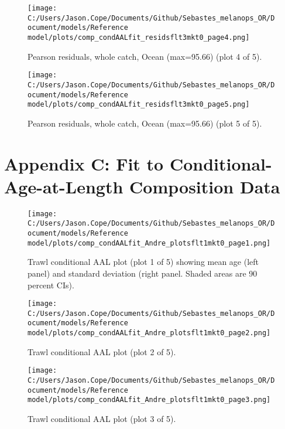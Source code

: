 \documentclass[11pt,
  english,
  letterpaper,
]{article}
\begin{document}
\begin{figure}
\centering
\texttt{[image: C:/Users/Jason.Cope/Documents/Github/Sebastes\_melanops\_OR/Document/models/Reference model/plots/comp\_condAALfit\_residsflt3mkt0\_page4.png]}
\caption{Pearson residuals, whole catch, Ocean (max=95.66) (plot 4 of 5).\label{fig:comp_condAALfit_residsflt3mkt0_page4}}
\end{figure}

\begin{figure}
\centering
\texttt{[image: C:/Users/Jason.Cope/Documents/Github/Sebastes\_melanops\_OR/Document/models/Reference model/plots/comp\_condAALfit\_residsflt3mkt0\_page5.png]}
\caption{Pearson residuals, whole catch, Ocean (max=95.66) (plot 5 of 5).\label{fig:comp_condAALfit_residsflt3mkt0_page5}}
\end{figure}

\clearpage

\hypertarget{app-c}{%
\section{Appendix C: Fit to Conditional-Age-at-Length Composition Data}\label{app-c}}

\begin{figure}
\centering
\texttt{[image: C:/Users/Jason.Cope/Documents/Github/Sebastes\_melanops\_OR/Document/models/Reference model/plots/comp\_condAALfit\_Andre\_plotsflt1mkt0\_page1.png]}
\caption{Trawl conditional AAL plot (plot 1 of 5) showing mean age (left panel) and standard deviation (right panel. Shaded areas are 90 percent CIs).\label{fig:comp_condAALfit_Andre_plotsflt1mkt0_page1}}
\end{figure}

\begin{figure}
\centering
\texttt{[image: C:/Users/Jason.Cope/Documents/Github/Sebastes\_melanops\_OR/Document/models/Reference model/plots/comp\_condAALfit\_Andre\_plotsflt1mkt0\_page2.png]}
\caption{Trawl conditional AAL plot (plot 2 of 5).\label{fig:comp_condAALfit_Andre_plotsflt1mkt0_page2}}
\end{figure}

\begin{figure}
\centering
\texttt{[image: C:/Users/Jason.Cope/Documents/Github/Sebastes\_melanops\_OR/Document/models/Reference model/plots/comp\_condAALfit\_Andre\_plotsflt1mkt0\_page3.png]}
\caption{Trawl conditional AAL plot (plot 3 of 5).\label{fig:comp_condAALfit_Andre_plotsflt1mkt0_page3}}
\end{figure}
\end{document}
